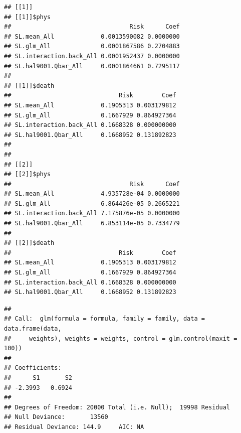 \documentclass[
]{book}
\newenvironment{Shaded}{\begin{snugshade}}{\end{snugshade}}
\newcommand{\DocumentationTok}[1]{\textcolor[rgb]{0.56,0.35,0.01}{\textbf{\textit{#1}}}}
\newcommand{\NormalTok}[1]{#1}
\newcommand{\SpecialCharTok}[1]{\textcolor[rgb]{0.81,0.36,0.00}{\textbf{#1}}}
\begin{document}
\begin{Shaded}
\end{Shaded}

\begin{verbatim}
## [[1]]
## [[1]]$phys
##                                 Risk      Coef
## SL.mean_All             0.0013590082 0.0000000
## SL.glm_All              0.0001867586 0.2704883
## SL.interaction.back_All 0.0001952437 0.0000000
## SL.hal9001.Qbar_All     0.0001864661 0.7295117
## 
## [[1]]$death
##                              Risk        Coef
## SL.mean_All             0.1905313 0.003179812
## SL.glm_All              0.1667929 0.864927364
## SL.interaction.back_All 0.1668328 0.000000000
## SL.hal9001.Qbar_All     0.1668952 0.131892823
## 
## 
## [[2]]
## [[2]]$phys
##                                 Risk      Coef
## SL.mean_All             4.935728e-04 0.0000000
## SL.glm_All              6.864426e-05 0.2665221
## SL.interaction.back_All 7.175876e-05 0.0000000
## SL.hal9001.Qbar_All     6.853114e-05 0.7334779
## 
## [[2]]$death
##                              Risk        Coef
## SL.mean_All             0.1905313 0.003179812
## SL.glm_All              0.1667929 0.864927364
## SL.interaction.back_All 0.1668328 0.000000000
## SL.hal9001.Qbar_All     0.1668952 0.131892823
\end{verbatim}

\begin{Shaded}
\end{Shaded}

\begin{verbatim}
## 
## Call:  glm(formula = formula, family = family, data = data.frame(data, 
##     weights), weights = weights, control = glm.control(maxit = 100))
## 
## Coefficients:
##      S1       S2  
## -2.3993   0.6924  
## 
## Degrees of Freedom: 20000 Total (i.e. Null);  19998 Residual
## Null Deviance:       13560 
## Residual Deviance: 144.9     AIC: NA
\end{verbatim}
\end{document}

